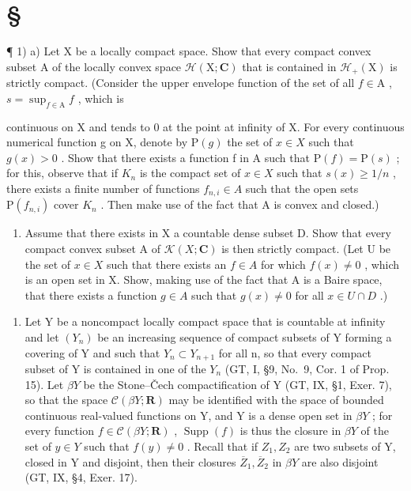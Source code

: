 \section*{\texorpdfstring{\S\CurrentExerciseGroup}{Section \CurrentExerciseGroup}}
{}

¶ 1) a) Let X be a locally compact space. Show that every compact convex subset A of the locally convex space \(\mathcal{H}(\mathrm{X};\mathbf{C})\) that is contained in \(\mathcal{H}_{+}(\mathrm{X})\) is strictly compact. (Consider the upper envelope function of the set of all \(f\in\mathrm{A}\) , \(s=\sup_{f\in\mathrm{A}}f\) , which is

continuous on X and tends to 0 at the point at infinity of X. For every continuous numerical function g on X, denote by \(\mathrm{P}(g)\) the set of \(x \in X\) such that \(g(x) > 0\) . Show that there exists a function f in A such that \(\mathrm{P}(f) = \mathrm{P}(s)\) ; for this, observe that if \(K_{n}\) is the compact set of \(x \in X\) such that \(s(x) \geqslant 1/n\) , there exists a finite number of functions \(f_{n,i} \in A\) such that the open sets \(\mathrm{P}(f_{n,i})\) cover \(K_{n}\) . Then make use of the fact that A is convex and closed.)

\begin{enumerate}
\def\labelenumi{\alph{enumi})}
\setcounter{enumi}{1}
\tightlist
\item
  Assume that there exists in X a countable dense subset D. Show that every compact convex subset A of \(\mathcal{K}(X; \mathbf{C})\) is then strictly compact. (Let U be the set of \(x \in X\) such that there exists an \(f \in A\) for which \(f(x) \neq 0\) , which is an open set in X. Show, making use of the fact that A is a Baire space, that there exists a function \(g \in A\) such that \(g(x) \neq 0\) for all \(x \in U \cap D\) .)
\end{enumerate}

\begin{enumerate}
\def\labelenumi{\arabic{enumi})}
\setcounter{enumi}{1}
\tightlist
\item
  Let Y be a noncompact locally compact space that is countable at infinity and let \((Y_{n})\) be an increasing sequence of compact subsets of Y forming a covering of Y and such that \(Y_{n} \subset Y_{n+1}\) for all n, so that every compact subset of Y is contained in one of the \(Y_{n}\) (GT, I, §9, No.~9, Cor. 1 of Prop. 15). Let \(\beta Y\) be the Stone--Čech compactification of Y (GT, IX, §1, Exer. 7), so that the space \(\mathcal{C}(\beta Y; \mathbf{R})\) may be identified with the space of bounded continuous real-valued functions on Y, and Y is a dense open set in \(\beta Y\) ; for every function \(f \in \mathcal{C}(\beta Y; \mathbf{R})\) , \(\operatorname{Supp}(f)\) is thus the closure in \(\beta Y\) of the set of \(y \in Y\) such that \(f(y) \neq 0\) . Recall that if \(Z_{1}, Z_{2}\) are two subsets of Y, closed in Y and disjoint, then their closures \(\overline{Z}_{1}, \overline{Z}_{2}\) in \(\beta Y\) are also disjoint (GT, IX, §4, Exer. 17).
\end{enumerate}

